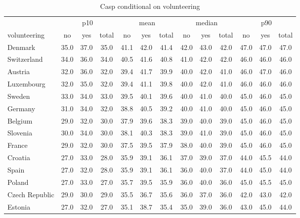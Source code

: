 \begin{table}[H]
  \centering
  \caption{Casp conditional on volunteering}
    \begin{tabular}{lcccccccccccc}
          & \multicolumn{3}{p{12.165em}}{p10} & \multicolumn{3}{p{12.165em}}{mean} & \multicolumn{3}{p{12.165em}}{median} & \multicolumn{3}{p{12.165em}}{p90} \\
    volunteering & no    & yes   & total & no    & yes   & total & no    & yes   & total & no    & yes   & total \\
    Denmark & 35.0  & 37.0  & 35.0  & 41.1  & 42.0  & 41.4  & 42.0  & 43.0  & 42.0  & 47.0  & 47.0  & 47.0 \\
    Switzerland & 34.0  & 36.0  & 34.0  & 40.5  & 41.6  & 40.8  & 41.0  & 42.0  & 42.0  & 46.0  & 46.0  & 46.0 \\
    Austria & 32.0  & 36.0  & 32.0  & 39.4  & 41.7  & 39.9  & 40.0  & 42.0  & 41.0  & 46.0  & 47.0  & 46.0 \\
    Luxembourg & 32.0  & 35.0  & 32.0  & 39.4  & 41.1  & 39.8  & 40.0  & 42.0  & 41.0  & 46.0  & 46.0  & 46.0 \\
    Sweden & 33.0  & 34.0  & 33.0  & 39.5  & 40.1  & 39.6  & 40.0  & 41.0  & 40.0  & 45.0  & 46.0  & 45.0 \\
    Germany & 31.0  & 34.0  & 32.0  & 38.8  & 40.5  & 39.2  & 40.0  & 41.0  & 40.0  & 45.0  & 46.0  & 45.0 \\
    Belgium & 29.0  & 32.0  & 30.0  & 37.9  & 39.6  & 38.3  & 39.0  & 40.0  & 39.0  & 45.0  & 46.0  & 45.0 \\
    Slovenia & 30.0  & 34.0  & 30.0  & 38.1  & 40.3  & 38.3  & 39.0  & 41.0  & 39.0  & 45.0  & 46.0  & 45.0 \\
    France & 29.0  & 32.0  & 30.0  & 37.5  & 39.5  & 37.9  & 38.0  & 40.0  & 39.0  & 45.0  & 46.0  & 45.0 \\
    Croatia & 27.0  & 33.0  & 28.0  & 35.9  & 39.1  & 36.1  & 37.0  & 39.0  & 37.0  & 44.0  & 45.5  & 44.0 \\
    Spain & 27.0  & 32.0  & 28.0  & 35.9  & 39.1  & 36.1  & 36.0  & 40.0  & 37.0  & 44.0  & 45.0  & 44.0 \\
    Poland & 27.0  & 33.0  & 27.0  & 35.7  & 39.5  & 35.9  & 36.0  & 40.0  & 36.0  & 45.0  & 45.5  & 45.0 \\
    Czech Republic & 29.0  & 30.0  & 29.0  & 35.5  & 36.7  & 35.6  & 36.0  & 37.0  & 36.0  & 42.0  & 43.0  & 42.0 \\
    Estonia & 27.0  & 32.0  & 27.0  & 35.1  & 38.7  & 35.4  & 35.0  & 39.0  & 36.0  & 43.0  & 45.0  & 44.0 \\

\end{tabular}
\end{table}

